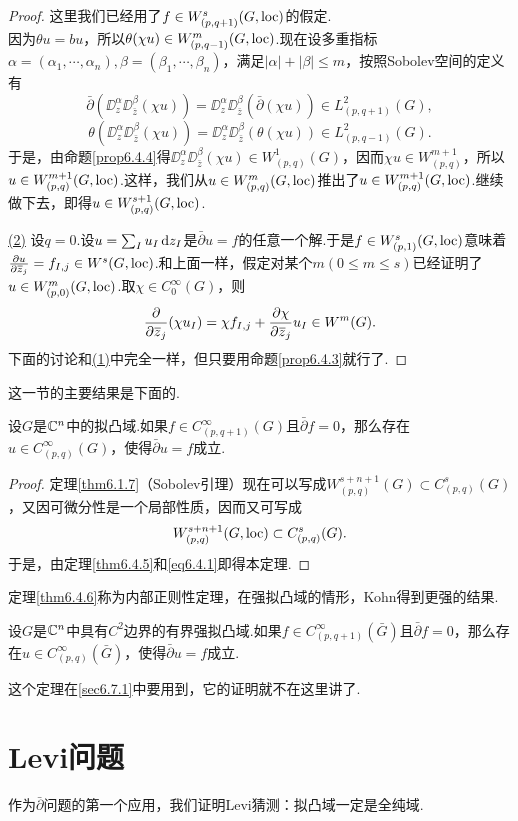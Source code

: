 \begin{proof}
	这里我们已经用了$f\in W_{(p,q+1)}^s(G,\operatorname{loc})$的假定.\\
	因为$\theta u=bu$，所以$\theta(\chi u)\in W_{(p,q-1)}^m(G,\operatorname{loc})$.现在设多重指标$\alpha=(\alpha_1,\cdots,\alpha_n),\beta=(\beta_1,\cdots,\beta_n)$，满足$|\alpha|+|\beta|\le m$，按照Sobolev空间的定义有
	\[\bar{\partial}(\DD_z^\alpha\DD_{\bar{z}}^\beta(\chi u))=\DD_z^\alpha\DD_{\bar{z}}^\beta(\bar{\partial}(\chi u))\in L_{(p,q+1)}^2(G),\]
	\[\theta(\DD_z^\alpha\DD_{\bar{z}}^\beta(\chi u))=\DD_z^\alpha\DD_{\bar{z}}^\beta(\theta(\chi u))\in L_{(p,q-1)}^2(G).\]
	于是，由命题\ref{prop6.4.4}得$\DD_z^\alpha\DD_{\bar{z}}^\beta(\chi u)\in W_{(p,q)}^1(G)$，因而$\chi u\in W_{(p,q)}^{m+1}$，所以$u\in W_{(p,q)}^{m+1}(G,\operatorname{loc})$.这样，我们从$u\in W_{(p,q)}^m(G,\operatorname{loc})$推出了$u\in W_{(p,q)}^{m+1}(G,\operatorname{loc})$.继续做下去，即得$u\in W_{(p,q)}^{s+1}(G,\operatorname{loc})$.
	
	\hyperlink{6.4.5}{(2)}
	设$q=0$.设$u=\sum_I u_I\mathop{}\!\mathrm dz_I$是$\bar{\partial}u=f$的任意一个解.于是$f\in W_{(p,1)}^s(G,\operatorname{loc})$意味着$\frac{\partial u}{\partial {}\mkern1mu\overline{\mkern-1muz}_j}=f_{I,j}\in W^s(G,\operatorname{loc})$.和上面一样，假定对某个$m(0\le m\le s)$已经证明了$u\in W_{(p,0)}^m(G,\operatorname{loc})$.取$\chi\in C_0^\infty(G)$，则
	\[\frac{\partial }{\partial {}\mkern1mu\overline{\mkern-1muz}_j}(\chi u_I)=\chi f_{I,j}+\frac{\partial \chi}{\partial {}\mkern1mu\overline{\mkern-1muz}_j}u_I\in W^m(G).\]
	下面的讨论和\hyperlink{6.4.5}{(1)}中完全一样，但只要用命题\ref{prop6.4.3}就行了.
\end{proof}
这一节的主要结果是下面的.
\begin{theorem}\label{thm6.4.6}
	设$G$是$\mathbb C^n$中的拟凸域.如果$f\in C_{(p,q+1)}^\infty(G)$且$\bar{\partial}f=0$，那么存在$u\in C_{(p,q)}^\infty(G)$，使得$\bar{\partial}u=f$成立.
\end{theorem}
\begin{proof}
	定理\ref{thm6.1.7}（Sobolev引理）现在可以写成$W_{(p,q)}^{s+n+1}(G)\subset C_{(p,q)}^s(G)$，又因可微分性是一个局部性质，因而又可写成
	\begin{equation}\label{eq6.4.1}
		W_{(p,q)}^{s+n+1}(G,\operatorname{loc})\subset C_{(p,q)}^s(G).
	\end{equation}
	于是，由定理\ref{thm6.4.5}和\eqref{eq6.4.1}即得本定理.
\end{proof}
定理\ref{thm6.4.6}称为内部正则性定理，在强拟凸域的情形，Kohn得到更强的结果.
\begin{theorem}\label{thm6.4.7}
	设$G$是$\mathbb C^n$中具有$C^2$边界的有界强拟凸域.如果$f\in C_{(p,q+1)}^\infty(\bar{G})$且$\bar{\partial}f=0$，那么存在$u\in C_{(p,q)}^\infty(\bar{G})$，使得$\bar{\partial}u=f$成立.
\end{theorem}
这个定理在\ref{sec6.7.1}中要用到，它的证明就不在这里讲了.
\section{Levi问题\label{sec6.5}}
作为$\bar{\partial}$问题的第一个应用，我们证明Levi猜测：拟凸域一定是全纯域.

